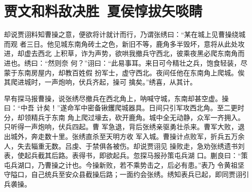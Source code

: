 \chapter{贾文和料敌决胜~夏侯惇拔矢啖睛}

却说贾诩料知曹操之意，便欲将计就计而行，乃谓张绣曰：“某在城上见曹操绕城而观
者三日。他见城东南角砖土之色，新旧不等，鹿角多半毁坏，意将从此处攻进，却虚去西北
上积草，诈为声势，欲哄我撤兵守西北，彼乘夜黑必爬东南角而进也。绣曰：“然则奈
何？”诩曰：“此易事耳。来日可今精壮之兵，饱食轻装，尽蒙于东南房屋内，却教百姓假
扮军士，虚守西北。夜间任他在东南角上爬城。俟其爬进城时，一声炮响，伏兵齐起，操可
擒矣。”绣喜，从其计。

早有探马报曹操，说张绣尽撤兵在西北角上，呐喊守城，东南却甚空虚。操曰：“中吾
计矣！”遂命军中密备锹钁爬城器具。日间只引军攻西北角。至二更时分，却领精兵于东南
角上爬过壕去，砍开鹿角。城中全无动静，众军一齐拥入。只听得一声炮响，伏兵四起。曹
军急退，背后张绣亲驱勇壮杀来。曹军大败，退出城外，奔走数十里。张绣直杀至天明方收
军入城。曹操计点败军，折兵五万余人，失去辎重无数。吕虔、于禁俱各被伤。却说贾诩见
操败走，急劝张绣遗书刘表，使起兵截其后路。表得书，即欲起兵。忽探马报孙策屯兵湖
口。蒯良曰：“策屯兵湖口，乃曹操之计也。今操新败，若不乘势击之，后必有患。”表乃
令黄祖坚守隘口，自己统兵至安众县截操后路；一面约会张绣。绣知表兵已起，即同贾诩引
兵袭操。

